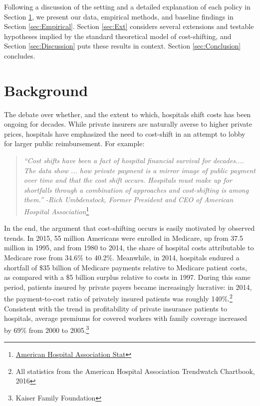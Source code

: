\documentclass[12pt]{article}
\begin{document}
Following a discussion of the setting and a detailed explanation of each policy in Section \ref{sec:Background}, we present our data, empirical methods, and baseline findings in Section \ref{sec:Empirical}. Section \ref{sec:Ext} considers several extensions and testable hypotheses implied by the standard theoretical model of cost-shifting, and Section \ref{sec:Discussion} puts these results in context.  Section \ref{sec:Conclusion} concludes.

\section{Background}
\label{sec:Background}

The debate over whether, and the extent to which, hospitals shift costs has been ongoing for decades. While private insurers are naturally averse to higher private prices, hospitals have emphasized the need to cost-shift in an attempt to lobby for larger public reimbursement. For example:
\begin{quote}
\textit{``Cost shifts have been a fact of hospital financial survival for decades.... The data show ...  how private payment is a mirror image of public payment over time and that the cost shift occurs. Hospitals must make up for shortfalls through a combination of approaches and cost-shifting is among them.'' -Rich Umbdenstock, Former President and CEO of American Hospital Association}\footnote{\href{$http://blog.aha.org/post/costshifting-in-hospitals-$}{American Hospital Association Stat}}
\end{quote}

In the end, the argument that cost-shifting occurs is easily motivated by observed trends.  In 2015, 55 million Americans were enrolled in Medicare, up from 37.5 million in 1995, and from 1980 to 2014, the share of hospital costs attributable to Medicare rose from 34.6$\%$ to 40.2$\%$.  Meanwhile, in 2014, hospitals endured a shortfall of $\$$35 billion of Medicare payments relative to Medicare patient costs, as compared with a $\$$5 billion surplus relative to costs in 1997.  During this same period, patients insured by private payers became increasingly lucrative: in 2014, the payment-to-cost ratio of privately insured patients was roughly 140$\%$.\footnote{All statistics from the American Hospital Association Trendwatch Chartbook, 2016} Consistent with the trend in profitability of private insurance patients to hospitals, average premiums for covered workers with family coverage increased by 69$\%$ from 2000 to 2005.\footnote{Kaiser Family Foundation}
\end{document}
